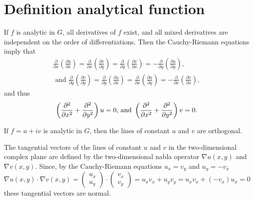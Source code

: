   \section{Definition analytical function}
{\color{OliveGreen}
\bproof
If $f$ is analytic in $G$, all derivatives of $f$ exist, and all mixed derivatives are independent on the order of differentiations.
Then the  Cauchy-Riemann equations  imply that
\begin{equation}
\begin{split}
\frac{\partial }{\partial x}\left(\frac{\partial u}{\partial x}\right)=
\frac{\partial }{\partial x}\left(\frac{\partial v}{\partial y}\right)=
\frac{\partial }{\partial y}\left(\frac{\partial v}{\partial x}\right)=
 -\frac{\partial }{\partial y}\left(\frac{\partial u}{\partial y}\right),     \\
\textrm{ and }\frac{\partial }{\partial y}\left(\frac{\partial v}{\partial y}\right)=
\frac{\partial }{\partial y}\left(\frac{\partial u}{\partial x}\right)=
\frac{\partial }{\partial x}\left(\frac{\partial u}{\partial y}\right)=
-\frac{\partial }{\partial x}\left(\frac{\partial v}{\partial x}\right)
,
\end{split}
\end{equation}
and thus
\eproof
}
\begin{equation}
 \left({\partial^2\over \partial x^2}
 + {\partial^2\over \partial y^2}\right)u=0      \textrm{, and }
 \left({\partial^2\over \partial x^2}
 + {\partial^2\over \partial y^2}\right)v=0 .
 \end{equation}


 If $f=u+iv$ is analytic in $G$, then the lines of constant $u$ and $v$ are orthogonal.

 {\color{OliveGreen}
\bproof
 The tangential vectors of the lines of constant $u$ and $v$ in the two-dimensional complex plane are defined by the two-dimensional nabla operator
$\nabla u(x,y)$ and $\nabla v(x,y)$.
Since, by the  Cauchy-Riemann equations $u_x=v_y$ and $u_y=-v_x$
\begin{equation}
\nabla u(x,y)\cdot \nabla v(x,y)
=
\left(
\begin{array}{c}
u_x\\
u_y
\end{array}
\right)
\cdot
\left(
\begin{array}{c}
v_x\\
v_y
\end{array}
\right)
=  u_x  v_x + u_y v_y   =   u_x  v_x  + (-v_x) u_x =0
\end{equation}
these tangential vectors are normal.
\eproof
}


